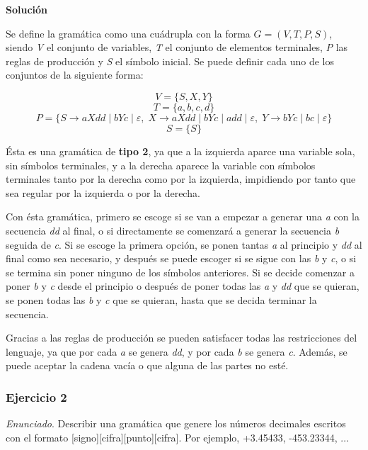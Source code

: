 \documentclass[11pt,a4paper]{article}
\newcommand{\enu}{\textit{Enunciado}}
\newcommand{\sol}{\textbf{Solución}}
\begin{document}
		\sol \par
		
		
		Se define la gramática como una cuádrupla con la forma $G = (V, T, P, S)$, siendo \textit{V} el conjunto
		de variables, \textit{T} el conjunto de elementos terminales, \textit{P} las reglas de producción y
		\textit{S} el símbolo inicial. Se puede definir cada uno de los conjuntos de la siguiente forma: \par
		\[V = \lbrace S, X, Y \rbrace\]
		\[T = \lbrace a, b, c, d \rbrace\]
		\[P = \lbrace S \rightarrow aXdd \; | \; bYc \; | \; \varepsilon, 
			   \; X \rightarrow aXdd \; | \; bYc \; | \; add \; | \; \varepsilon,
			   \; Y \rightarrow bYc \; | \; bc \; | \; \varepsilon \rbrace
		\]
		\[S = \lbrace S \rbrace \]
		\par
		
		Ésta es una gramática de \textbf{tipo 2}, ya que a la izquierda aparce una variable sola, sin símbolos
		terminales, y a la derecha aparece la variable con símbolos terminales tanto por la derecha como por la
		izquierda, impidiendo por tanto que sea regular por la izquierda o por la derecha. \par
		
		Con ésta gramática, primero se escoge si se van a empezar a generar una \textit{a} con la secuencia
		\textit{dd} al final, o si directamente se comenzará a generar la secuencia \textit{b} seguida de
		\textit{c}. Si se escoge la primera opción, se ponen tantas \textit{a} al principio y \textit{dd} al
		final como sea necesario, y después se puede escoger si se sigue con las \textit{b} y \textit{c}, o
		si se termina sin poner ninguno de los símbolos anteriores. Si se decide comenzar a poner \textit{b}
		y \textit{c} desde el principio o después de poner todas las \textit{a} y \textit{dd} que se quieran,
		se ponen todas las \textit{b} y \textit{c} que se quieran, hasta que se decida terminar la secuencia.
		\par
		
		Gracias a las reglas de producción se pueden satisfacer todas las restricciones del lenguaje, ya que
		por cada  \textit{a} se genera \textit{dd}, y por cada \textit{b} se genera \textit{c}. Además, se puede
		aceptar la cadena vacía o que alguna de las partes no esté.
		
		\subsubsection{Ejercicio 2}
		\enu. Describir una gramática que genere los números decimales escritos con el formato
		[signo][cifra][punto][cifra]. Por ejemplo, +3.45433, -453.23344, ...\par
\end{document}
